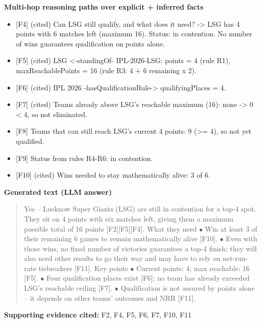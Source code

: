 \noindent\textcolor{kgpath}{\textbf{Multi-hop reasoning paths over explicit + inferred facts}}
\begin{itemize}\setlength\itemsep{0pt}\footnotesize
\item{} [F4] (cited) Can LSG still qualify, and what does it need? -\textgreater{} LSG has 4 points with 6 matches left (maximum 16). Status: in contention. No number of wins guarantees qualification on points alone.
\item{} [F5] (cited) LSG \textless{}-standingOf- IPL-2026-LSG: points = 4 (rule R1), maxReachablePoints = 16 (rule R3: 4 + 6 remaining x 2).
\item{} [F6] (cited) IPL 2026 -hasQualificationRule-\textgreater{} qualifyingPlaces = 4.
\item{} [F7] (cited) Teams already above LSG's reachable maximum (16): none -\textgreater{} 0 \textless{} 4, so not eliminated.
\item{} [F8] Teams that can still reach LSG's current 4 points: 9 (\textgreater{}= 4), so not yet qualified.
\item{} [F9] Status from rules R4-R6: in contention.
\item{} [F10] (cited) Wins needed to stay mathematically alive: 3 of 6.
\end{itemize}
\noindent\textcolor{kggenerated}{\textbf{Generated text (LLM answer)}}
\begin{quote}\small Yes -- Lucknow Super Giants (LSG) are still in contention for a top-4 spot. They sit on 4 points with six matches left, giving them a maximum possible total of 16 points \textsf{[F2]}\textsf{[F5]}\textsf{[F4]}. \newline What they need \newline \quad$\bullet$ Win at least 3 of their remaining 6 games to remain mathematically alive \textsf{[F10]}. \newline \quad$\bullet$ Even with those wins, no fixed number of victories guarantees a top-4 finish; they will also need other results to go their way and may have to rely on net-run-rate tiebreakers \textsf{[F11]}. \newline Key points \newline \quad$\bullet$ Current points: 4; max reachable: 16 \textsf{[F5]}. \newline \quad$\bullet$ Four qualification places exist \textsf{[F6]}; no team has already exceeded LSG's reachable ceiling \textsf{[F7]}. \newline \quad$\bullet$ Qualification is not assured by points alone -- it depends on other teams' outcomes and NRR \textsf{[F11]}.\end{quote}
\noindent\textbf{Supporting evidence cited:} F2, F4, F5, F6, F7, F10, F11\par\medskip
